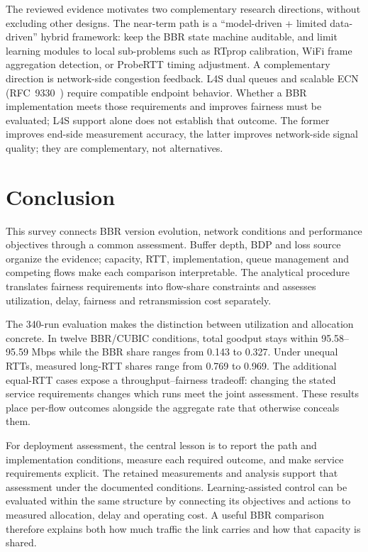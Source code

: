 \documentclass[a4paper,fleqn]{cas-sc}
\begin{document}
The reviewed evidence motivates two complementary research directions,
without excluding other designs. The near-term path is a ``model-driven + limited data-driven'' hybrid
framework: keep the BBR state machine auditable, and limit learning modules to
local sub-problems such as RTprop calibration, WiFi frame aggregation detection,
or ProbeRTT timing adjustment. A complementary direction is network-side congestion feedback. L4S dual
queues and scalable ECN (RFC~9330~\citep{rfc9330}) require compatible
endpoint behavior. Whether a BBR implementation meets those requirements
and improves fairness must be evaluated; L4S support alone does not
establish that outcome. The former improves end-side measurement
accuracy, the latter improves network-side signal quality; they are complementary,
not alternatives.


\FloatBarrier

\section{Conclusion}
\label{sec:conclusion}

This survey connects BBR version evolution, network conditions and
performance objectives through a common assessment. Buffer depth, BDP and
loss source organize the evidence; capacity, RTT, implementation, queue
management and competing flows make each comparison interpretable. The
analytical procedure translates fairness requirements into flow-share
constraints and assesses utilization, delay, fairness and retransmission
cost separately.

The 340-run evaluation makes the distinction between utilization and
allocation concrete. In twelve BBR/CUBIC conditions, total goodput stays
within 95.58--95.59 Mbps while the BBR share ranges from 0.143 to 0.327.
Under unequal RTTs, measured long-RTT shares range from 0.769 to 0.969.
The additional equal-RTT cases expose a throughput--fairness tradeoff:
changing the stated service requirements changes which runs meet the
joint assessment. These results place per-flow outcomes alongside the
aggregate rate that otherwise conceals them.

For deployment assessment, the central lesson is to report the path and
implementation conditions, measure each required outcome, and make service
requirements explicit. The retained measurements and analysis support
that assessment under the documented conditions. Learning-assisted control
can be evaluated within the same structure by connecting its objectives
and actions to measured allocation, delay and operating cost. A useful
BBR comparison therefore explains both how much traffic the link carries
and how that capacity is shared.
\end{document}
